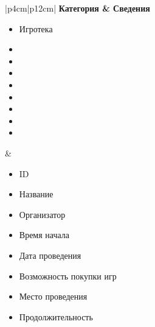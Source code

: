 \begin{table}[h!]
    \begin{center}
    \begin{threeparttable}
        \captionsetup{format=hang,justification=raggedright,
                      singlelinecheck=off}
        \caption{\label{tab:01}Категории данных и сведения о них}
        \renewcommand{\arraystretch}{1.5}
        \begin{tabular}{|p{4cm}|p{12cm}|}
            \hline
            \bfseries Категория & \bfseries Сведения\\
            \hline
            \begin{minipage}[t]{\linewidth}
              \begin{multicols}{1}
                \begin{itemize}[leftmargin=0mm,labelsep=0mm,nosep,after=\strut]
                  \item[] Игротека
                  \item[]
                  \item[]
                  \item[]
                  \item[]
                  \item[]
                  \item[]
                  \item[]
                  \item[]
                \end{itemize}
              \end{multicols}
            \end{minipage}
          & \begin{minipage}[t]{\linewidth}
              \begin{multicols}{2}
                \begin{itemize}[leftmargin=0mm,labelsep=0mm,nosep,after=\strut]
                  \item[] ID
                  \item[] Название
                  \item[] Организатор
                  \item[] Время начала
                  \item[] Дата проведения
                  \item[] Возможность покупки игр
                  \item[] Место проведения
                  \item[] Продолжительность

\end{itemize}
\end{multicols}
\end{minipage}
\end{tabular}
\end{threeparttable}
\end{center}
\end{table}
